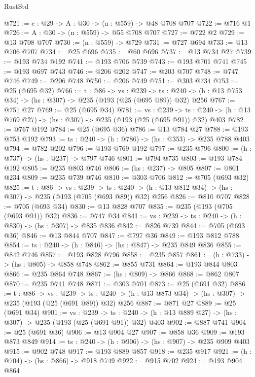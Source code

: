\begin{lexlean}{RustStd}
\begin{coremodule}
@721 := {c : @29} -> {A : @30} -> (n : @559) -> @48 @708 @707
@722 := @716 @1
@726 := {A : @30} -> (n : @559) -> @55 @708 @707
@727 := @722 @2
@729 := @13 @708 @707
@730 := (n : @559) -> @729
@731 := @727 @694
@733 := @13 @706 @707
@734 := @25 @696
@735 := @60 @696
@737 := @13 @734 @27
@739 := @193 @734 @192
@741 := @193 @706 @739
@743 := @193 @701 @741
@745 := @193 @697 @743
@746 := @206 @202
@747 := @203 @707
@748 := @747 @746
@749 := @206 @748
@750 := @206 @749
@751 := @303 @734
@753 := @25 (@695 @32)
@766 := {t : @86} ->
  {vs : @239} ->
  {ts : @240} -> (h : @13 @753 @34) -> (hs : @307) -> @235 (@193 (@25 (@695 @89)) @32) @256
@767 := @751 @27
@769 := @25 (@695 @34)
@781 := {vs : @239} ->
  {ts : @240} -> (h : @13 @769 @27) -> (hs : @307) -> @235 (@193 (@25 (@695 @91)) @32) @403
@782 := @767 @192
@784 := @25 (@695 @36)
@786 := @13 @784 @27
@788 := @193 @753 @192
@793 := {ts : @240} -> (h : @786) -> (hs : @353) -> @235 @788 @403
@794 := @782 @202
@796 := @193 @769 @192
@797 := @235 @796
@800 := (h : @737) -> (hs : @237) -> @797 @746
@801 := @794 @735
@803 := @193 @784 @192
@805 := @235 @803 @746
@806 := (hs : @237) -> @805
@807 := @801 @234
@809 := @235 @739 @746
@810 := @303 @706
@812 := @705 (@693 @32)
@825 := {t : @86} ->
  {vs : @239} ->
  {ts : @240} -> (h : @13 @812 @34) -> (hs : @307) -> @235 (@193 (@705 (@693 @89)) @32) @256
@826 := @810 @707
@828 := @705 (@693 @34)
@830 := @13 @828 @707
@835 := @235 (@193 (@705 (@693 @91)) @32)
@836 := @747 @34
@841 := {vs : @239} -> {ts : @240} -> (h : @830) -> (hs : @307) -> @835 @836
@842 := @826 @739
@844 := @705 (@693 @36)
@846 := @13 @844 @707
@847 := @797 @36
@849 := @193 @812 @788
@854 := {ts : @240} -> (h : @846) -> (hs : @847) -> @235 @849 @836
@855 := @842 @746
@857 := @193 @828 @796
@858 := @235 @857
@861 := (h : @733) -> (hs : @805) -> @858 @748
@862 := @855 @731
@864 := @193 @844 @803
@866 := @235 @864 @748
@867 := (hs : @809) -> @866
@868 := @862 @807
@870 := @235 @741 @748
@871 := @303 @701
@873 := @25 (@691 @32)
@886 := {t : @86} ->
  {vs : @239} ->
  {ts : @240} -> (h : @13 @873 @34) -> (hs : @307) -> @235 (@193 (@25 (@691 @89)) @32) @256
@887 := @871 @27
@889 := @25 (@691 @34)
@901 := {vs : @239} ->
  {ts : @240} -> (h : @13 @889 @27) -> (hs : @307) -> @235 (@193 (@25 (@691 @91)) @32) @403
@902 := @887 @741
@904 := @25 (@691 @36)
@906 := @13 @904 @27
@907 := @858 @36
@909 := @193 @873 @849
@914 := {ts : @240} -> (h : @906) -> (hs : @907) -> @235 @909 @403
@915 := @902 @748
@917 := @193 @889 @857
@918 := @235 @917
@921 := (h : @704) -> (hs : @866) -> @918 @749
@922 := @915 @702
@924 := @193 @904 @864

\end{coremodule}
\end{lexlean}
